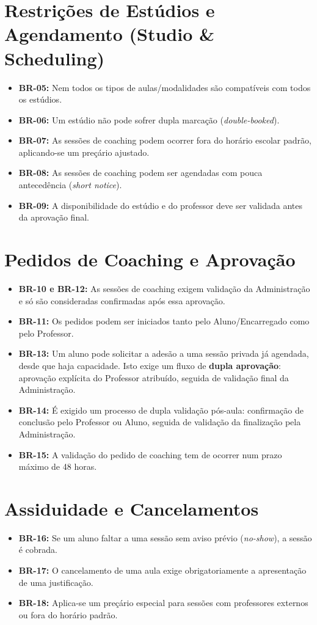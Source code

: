 \documentclass[12pt,a4paper]{report}
\begin{document}
\section{Restrições de Estúdios e Agendamento (Studio \& Scheduling)}
\begin{itemize}
    \item \textbf{BR-05:} Nem todos os tipos de aulas/modalidades são compatíveis com todos os estúdios.
    \item \textbf{BR-06:} Um estúdio não pode sofrer dupla marcação (\textit{double-booked}).
    \item \textbf{BR-07:} As sessões de coaching podem ocorrer fora do horário escolar padrão, aplicando-se um preçário ajustado.
    \item \textbf{BR-08:} As sessões de coaching podem ser agendadas com pouca antecedência (\textit{short notice}).
    \item \textbf{BR-09:} A disponibilidade do estúdio e do professor deve ser validada antes da aprovação final.
\end{itemize}

\section{Pedidos de Coaching e Aprovação}
\begin{itemize}
    \item \textbf{BR-10 e BR-12:} As sessões de coaching exigem validação da Administração e só são consideradas confirmadas após essa aprovação.
    \item \textbf{BR-11:} Os pedidos podem ser iniciados tanto pelo Aluno/Encarregado como pelo Professor.
    \item \textbf{BR-13:} Um aluno pode solicitar a adesão a uma sessão privada já agendada, desde que haja capacidade. Isto exige um fluxo de \textbf{dupla aprovação}: aprovação explícita do Professor atribuído, seguida de validação final da Administração.
    \item \textbf{BR-14:} É exigido um processo de dupla validação pós-aula: confirmação de conclusão pelo Professor ou Aluno, seguida de validação da finalização pela Administração.
    \item \textbf{BR-15:} A validação do pedido de coaching tem de ocorrer num prazo máximo de 48 horas.
\end{itemize}

\section{Assiduidade e Cancelamentos}
\begin{itemize}
    \item \textbf{BR-16:} Se um aluno faltar a uma sessão sem aviso prévio (\textit{no-show}), a sessão é cobrada.
    \item \textbf{BR-17:} O cancelamento de uma aula exige obrigatoriamente a apresentação de uma justificação.
    \item \textbf{BR-18:} Aplica-se um preçário especial para sessões com professores externos ou fora do horário padrão.
\end{itemize}
\end{document}
